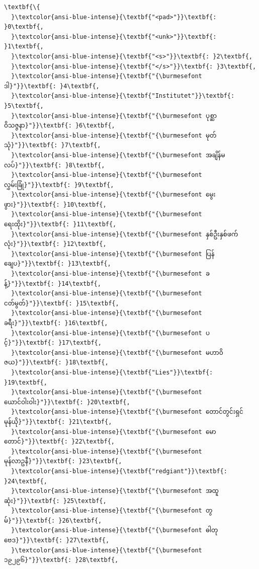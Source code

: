 \documentclass[11pt]{article}
\begin{document}
    \begin{Verbatim}[commandchars=\\\{\}]
\textbf{\{
  }\textcolor{ansi-blue-intense}{\textbf{"<pad>"}}\textbf{: }0\textbf{,
  }\textcolor{ansi-blue-intense}{\textbf{"<unk>"}}\textbf{: }1\textbf{,
  }\textcolor{ansi-blue-intense}{\textbf{"<s>"}}\textbf{: }2\textbf{,
  }\textcolor{ansi-blue-intense}{\textbf{"</s>"}}\textbf{: }3\textbf{,
  }\textcolor{ansi-blue-intense}{\textbf{"​{\burmesefont ဒါ}"}}\textbf{: }4\textbf{,
  }\textcolor{ansi-blue-intense}{\textbf{"Institutet"}}\textbf{: }5\textbf{,
  }\textcolor{ansi-blue-intense}{\textbf{"{\burmesefont ပုစ္ဆာဝိသဇ္ဇနာ}"}}\textbf{: }6\textbf{,
  }\textcolor{ansi-blue-intense}{\textbf{"{\burmesefont မုတ်သုံ}"}}\textbf{: }7\textbf{,
  }\textcolor{ansi-blue-intense}{\textbf{"{\burmesefont အချိန်မလပ်}"}}\textbf{: }8\textbf{,
  }\textcolor{ansi-blue-intense}{\textbf{"{\burmesefont လွှမ်းခြုံ}"}}\textbf{: }9\textbf{,
  }\textcolor{ansi-blue-intense}{\textbf{"{\burmesefont မွေးဖွား}"}}\textbf{: }10\textbf{,
  }\textcolor{ansi-blue-intense}{\textbf{"{\burmesefont ရေးထိုး}"}}\textbf{: }11\textbf{,
  }\textcolor{ansi-blue-intense}{\textbf{"{\burmesefont နှစ်ဦးနှစ်ဖက်လုံး}"}}\textbf{: }12\textbf{,
  }\textcolor{ansi-blue-intense}{\textbf{"{\burmesefont ပြန်ချေပ}"}}\textbf{: }13\textbf{,
  }\textcolor{ansi-blue-intense}{\textbf{"{\burmesefont ခန့်}"}}\textbf{: }14\textbf{,
  }\textcolor{ansi-blue-intense}{\textbf{"{\burmesefont ငတ်မွတ်}"}}\textbf{: }15\textbf{,
  }\textcolor{ansi-blue-intense}{\textbf{"{\burmesefont ခရီး}"}}\textbf{: }16\textbf{,
  }\textcolor{ansi-blue-intense}{\textbf{"{\burmesefont ပင့်}"}}\textbf{: }17\textbf{,
  }\textcolor{ansi-blue-intense}{\textbf{"{\burmesefont မဟာဝိဇယ}"}}\textbf{: }18\textbf{,
  }\textcolor{ansi-blue-intense}{\textbf{"Lies"}}\textbf{: }19\textbf{,
  }\textcolor{ansi-blue-intense}{\textbf{"{\burmesefont ယောင်ဝါးဝါး}"}}\textbf{: }20\textbf{,
  }\textcolor{ansi-blue-intense}{\textbf{"{\burmesefont တောင်တွင်းရှင်မုန်ယို}"}}\textbf{: }21\textbf{,
  }\textcolor{ansi-blue-intense}{\textbf{"{\burmesefont မောတောင်}"}}\textbf{: }22\textbf{,
  }\textcolor{ansi-blue-intense}{\textbf{"{\burmesefont မုန်လာဥနီ}"}}\textbf{: }23\textbf{,
  }\textcolor{ansi-blue-intense}{\textbf{"redgiant"}}\textbf{: }24\textbf{,
  }\textcolor{ansi-blue-intense}{\textbf{"{\burmesefont အထူဆုံး}"}}\textbf{: }25\textbf{,
  }\textcolor{ansi-blue-intense}{\textbf{"{\burmesefont တွမ်}"}}\textbf{: }26\textbf{,
  }\textcolor{ansi-blue-intense}{\textbf{"{\burmesefont ဓါတုဗေဒ}"}}\textbf{: }27\textbf{,
  }\textcolor{ansi-blue-intense}{\textbf{"{\burmesefont ၁၉၂၉၆}"}}\textbf{: }28\textbf{,

\end{Verbatim}
\end{document}
